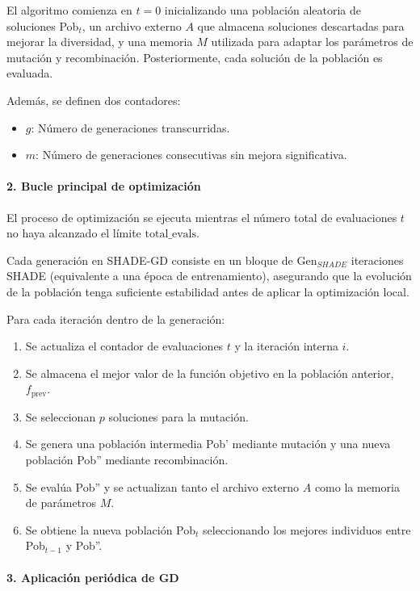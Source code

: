 El algoritmo comienza en $t = 0$ inicializando una población aleatoria de soluciones Pob$_t$, un archivo externo $A$ que almacena soluciones descartadas para mejorar la diversidad, y una memoria $M$ utilizada para adaptar los parámetros de mutación y recombinación. Posteriormente, cada solución de la población es evaluada.  

Además, se definen dos contadores:
\begin{itemize}
    \item $g$: Número de generaciones transcurridas.
    \item $m$: Número de generaciones consecutivas sin mejora significativa.
\end{itemize}

\paragraph{2. Bucle principal de optimización\\}

El proceso de optimización se ejecuta mientras el número total de evaluaciones $t$ no haya alcanzado el límite $\text{total\_evals}$.  

Cada generación en SHADE-GD consiste en un bloque de $\text{Gen}_{SHADE}$ iteraciones SHADE (equivalente a una época de entrenamiento), asegurando que la evolución de la población tenga suficiente estabilidad antes de aplicar la optimización local.  

Para cada iteración dentro de la generación:
\begin{enumerate}
    \item Se actualiza el contador de evaluaciones $t$ y la iteración interna $i$.
    \item Se almacena el mejor valor de la función objetivo en la población anterior, $f_{\text{prev}}$.
    \item Se seleccionan $p$ soluciones para la mutación.
    \item Se genera una población intermedia Pob' mediante mutación y una nueva población Pob'' mediante recombinación.
    \item Se evalúa Pob'' y se actualizan tanto el archivo externo $A$ como la memoria de parámetros $M$.
    \item Se obtiene la nueva población Pob$_t$ seleccionando los mejores individuos entre Pob$_{t-1}$ y Pob''.
\end{enumerate}

\paragraph{3. Aplicación periódica de GD\\}

